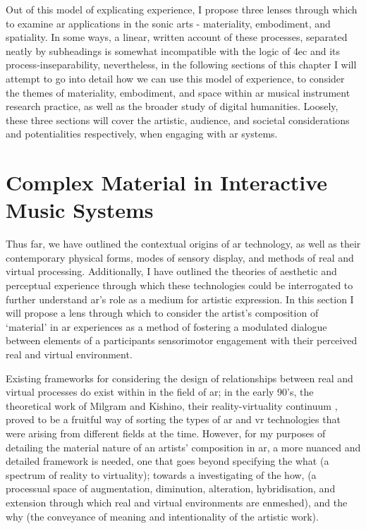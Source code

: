 Out of this model of explicating experience, I propose three lenses through which to examine \gls{ar} applications in the sonic arts - materiality, embodiment, and spatiality. In some ways, a linear, written account of these processes, separated neatly by subheadings is somewhat incompatible with the logic of \gls{4ec} and its process-inseparability, nevertheless, in the following sections of this chapter I will attempt to go into detail how we can use this model of experience, to consider the themes of materiality, embodiment, and space within \gls{ar} musical instrument research practice, as well as the broader study of digital humanities. Loosely, these three sections will cover the artistic, audience, and societal considerations and potentialities respectively, when engaging with \gls{ar} systems.



\section{Complex Material in Interactive Music Systems}\label{sec: theory-materiality}
Thus far, we have outlined the contextual origins of \gls{ar} technology, as well as their contemporary physical forms, modes of sensory display, and methods of real and virtual processing. Additionally, I have outlined the theories of aesthetic and perceptual experience through which these technologies could be interrogated to further understand \gls{ar}'s role as a medium for artistic expression. In this section I will propose a lens through which to consider the artist's composition of `material' in \gls{ar} experiences as a method of fostering a modulated dialogue between elements of a participants sensorimotor engagement with their perceived real and virtual environment.

Existing frameworks for considering the design of relationships between real and virtual processes do exist within in the field of \gls{ar}; in the early 90's, the theoretical work of Milgram and Kishino, their reality-virtuality continuum \citeyearpar[p. 10]{milgram1994}, proved to be a fruitful way of sorting the types of \gls{ar} and \gls{vr} technologies that were arising from different fields at the time. However, for my purposes of detailing the material nature of an artists' composition in \gls{ar}, a more nuanced and detailed framework is needed, one that goes beyond specifying the what (a spectrum of reality to virtuality); towards a investigating of the how, (a processual space of augmentation, diminution, alteration, hybridisation, and extension through which real and virtual environments are enmeshed), and the why (the conveyance of meaning and intentionality of the artistic work). 

